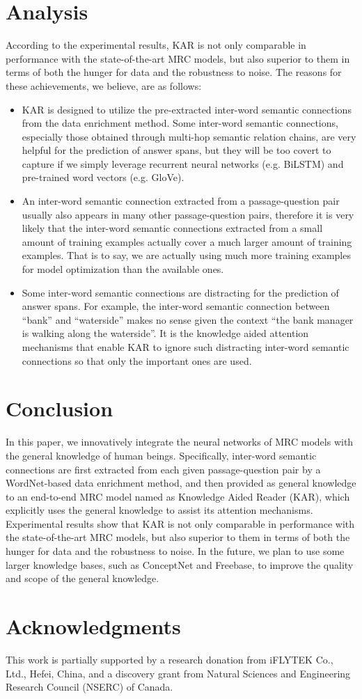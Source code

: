 \documentclass[11pt,a4paper]{article}
\begin{document}
\section{Analysis}
According to the experimental results, KAR is not only comparable in performance with the state-of-the-art MRC models, but also superior to them in terms of both the hunger for data and the robustness to noise. The reasons for these achievements, we believe, are as follows:
\begin{itemize}
\item KAR is designed to utilize the pre-extracted inter-word semantic connections from the data enrichment method. Some inter-word semantic connections, especially those obtained through multi-hop semantic relation chains, are very helpful for the prediction of answer spans, but they will be too covert to capture if we simply leverage recurrent neural networks (e.g. BiLSTM) and pre-trained word vectors (e.g. GloVe).
\item An inter-word semantic connection extracted from a passage-question pair usually also appears in many other passage-question pairs, therefore it is very likely that the inter-word semantic connections extracted from a small amount of training examples actually cover a much larger amount of training examples. That is to say, we are actually using much more training examples for model optimization than the available ones.
\item Some inter-word semantic connections are distracting for the prediction of answer spans. For example, the inter-word semantic connection between ``bank'' and ``waterside'' makes no sense given the context ``the bank manager is walking along the waterside''. It is the knowledge aided attention mechanisms that enable KAR to ignore such distracting inter-word semantic connections so that only the important ones are used.
\end{itemize}

\section{Conclusion}
In this paper, we innovatively integrate the neural networks of MRC models with the general knowledge of human beings. Specifically, inter-word semantic connections are first extracted from each given passage-question pair by a WordNet-based data enrichment method, and then provided as general knowledge to an end-to-end MRC model named as Knowledge Aided Reader (KAR), which explicitly uses the general knowledge to assist its attention mechanisms. Experimental results show that KAR is not only comparable in performance with the state-of-the-art MRC models, but also superior to them in terms of both the hunger for data and the robustness to noise. In the future, we plan to use some larger knowledge bases, such as ConceptNet and Freebase, to improve the quality and scope of the general knowledge.

\section*{Acknowledgments}
This work is partially supported  by a research donation from iFLYTEK Co., Ltd., Hefei, China, and a discovery grant from Natural Sciences and Engineering Research Council (NSERC) of Canada.



\end{document}
